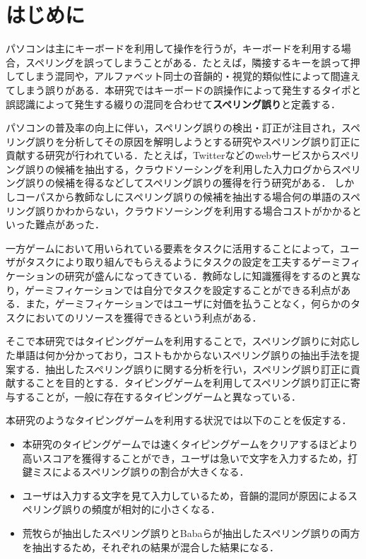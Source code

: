\chapter{はじめに}
パソコンは主にキーボードを利用して操作を行うが，キーボードを利用する場合，スペリングを誤ってしまうことがある．たとえば，隣接するキーを誤って押してしまう混同や，アルファベット同士の音韻的・視覚的類似性によって間違えてしまう誤りがある．本研究ではキーボードの誤操作によって発生するタイポと誤認識によって発生する綴りの混同を合わせて\textbf{スペリング誤り}と定義する．

パソコンの普及率の向上に伴い，スペリング誤りの検出・訂正が注目され，スペリング誤りを分析してその原因を解明しようとする研究やスペリング誤り訂正に貢献する研究が行われている．たとえば，Twitterなどのwebサービスからスペリング誤りの候補を抽出する\cite{aramakiNLP2010}，クラウドソーシングを利用した入力ログからスペリング誤りの候補を得る\cite{babaACL2012}などしてスペリング誤りの獲得を行う研究がある．
しかしコーパスから教師なしにスペリング誤りの候補を抽出する場合何の単語のスペリング誤りかわからない，クラウドソーシングを利用する場合コストがかかるといった難点があった．

一方ゲームにおいて用いられている要素をタスクに活用することによって，ユーザがタスクにより取り組んでもらえるようにタスクの設定を工夫するゲーミフィケーションの研究が盛んになってきている\cite{deterdingACM2011}．教師なしに知識獲得をするのと異なり，ゲーミフィケーションでは自分でタスクを設定することができる利点がある．また，ゲーミフィケーションではユーザに対価を払うことなく，何らかのタスクにおいてのリソースを獲得できるという利点がある．

そこで本研究ではタイピングゲームを利用することで，スペリング誤りに対応した単語は何か分かっており，コストもかからないスペリング誤りの抽出手法を提案する．抽出したスペリング誤りに関する分析を行い，スペリング誤り訂正に貢献することを目的とする．タイピングゲームを利用してスペリング誤り訂正に寄与することが，一般に存在するタイピングゲームと異なっている．

本研究のようなタイピングゲームを利用する状況では以下のことを仮定する．

\begin{itemize}
 \item 本研究のタイピングゲームでは速くタイピングゲームをクリアするほどより高いスコアを獲得することができ，ユーザは急いで文字を入力するため，打鍵ミスによるスペリング誤りの割合が大きくなる．
 \item ユーザは入力する文字を見て入力しているため，音韻的混同が原因によるスペリング誤りの頻度が相対的に小さくなる．
 \item 荒牧らが抽出したスペリング誤り\cite{aramakiNLP2010}とBabaらが抽出したスペリング誤り\cite{babaACL2012}の両方を抽出するため，それぞれの結果が混合した結果になる．
\end{itemize}

